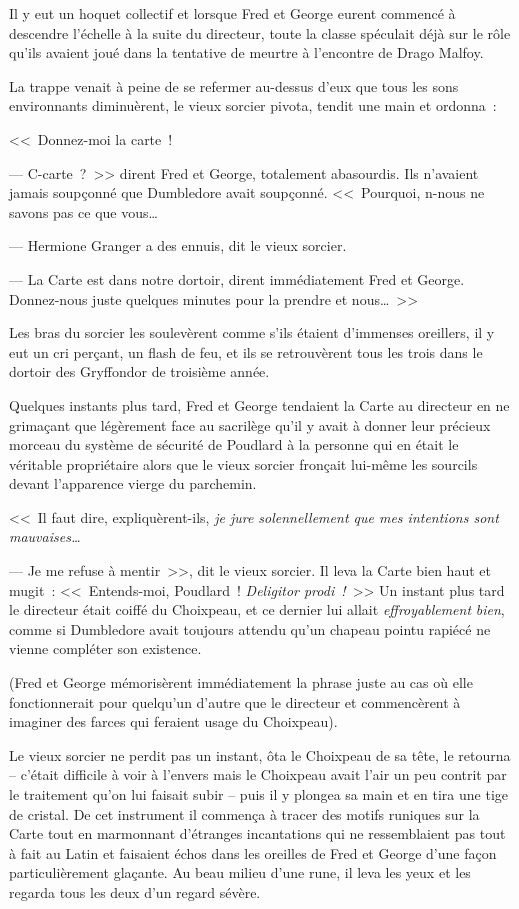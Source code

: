 Il y eut un hoquet collectif et lorsque Fred et George eurent commencé à descendre l'échelle à la suite du directeur, toute la classe spéculait déjà sur le rôle qu'ils avaient joué dans la tentative de meurtre à l'encontre de Drago Malfoy.

La trappe venait à peine de se refermer au-dessus d'eux que tous les sons environnants diminuèrent, le vieux sorcier pivota, tendit une main et ordonna~:

<<~Donnez-moi la carte~!

--- C-carte~?~>> dirent Fred et George, totalement abasourdis. Ils n'avaient jamais soupçonné que Dumbledore avait soupçonné. <<~Pourquoi, n-nous ne savons pas ce que vous…

--- Hermione Granger a des ennuis, dit le vieux sorcier.

--- La Carte est dans notre dortoir, dirent immédiatement Fred et George. Donnez-nous juste quelques minutes pour la prendre et nous…~>>

Les bras du sorcier les soulevèrent comme s'ils étaient d'immenses oreillers, il y eut un cri perçant, un flash de feu, et ils se retrouvèrent tous les trois dans le dortoir des Gryffondor de troisième année.

Quelques instants plus tard, Fred et George tendaient la Carte au directeur en ne grimaçant que légèrement face au sacrilège qu'il y avait à donner leur précieux morceau du système de sécurité de Poudlard à la personne qui en était le véritable propriétaire alors que le vieux sorcier fronçait lui-même les sourcils devant l'apparence vierge du parchemin.

<<~Il faut dire, expliquèrent-ils, \emph{je jure solennellement que mes intentions sont mauvaises…}

--- Je me refuse à mentir~>>, dit le vieux sorcier. Il leva la Carte bien haut et mugit~: <<~Entends-moi, Poudlard~! \emph{Deligitor prodi~!}~>> Un instant plus tard le directeur était coiffé du Choixpeau, et ce dernier lui allait \emph{effroyablement} \emph{bien}, comme si Dumbledore avait toujours attendu qu'un chapeau pointu rapiécé ne vienne compléter son existence.

(Fred et George mémorisèrent immédiatement la phrase juste au cas où elle fonctionnerait pour quelqu'un d'autre que le directeur et commencèrent à imaginer des farces qui feraient usage du Choixpeau).

Le vieux sorcier ne perdit pas un instant, ôta le Choixpeau de sa tête, le retourna -- c'était difficile à voir à l'envers mais le Choixpeau avait l'air un peu contrit par le traitement qu'on lui faisait subir -- puis il y plongea sa main et en tira une tige de cristal. De cet instrument il commença à tracer des motifs runiques sur la Carte tout en marmonnant d'étranges incantations qui ne ressemblaient pas tout à fait au Latin et faisaient échos dans les oreilles de Fred et George d'une façon particulièrement glaçante. Au beau milieu d'une rune, il leva les yeux et les regarda tous les deux d'un regard sévère.

